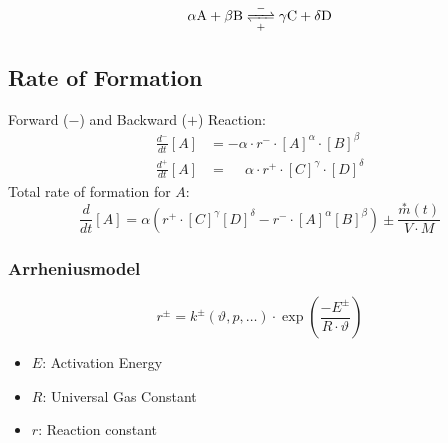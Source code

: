 \vspace{-0.5em}
\begin{align*}
    \alpha \ce{A} + \beta \ce{B} \underset{+}{\overset{-}{\ce{<=>}}}\gamma \ce{C} + \delta \ce{D}
\end{align*}
\subsection{Rate of Formation}
Forward ($-$) and Backward ($+$) Reaction:
\begin{align*}
    \frac{d^-}{dt}[A] &= - \alpha \cdot r^- \cdot [A]^\alpha \cdot [B]^\beta\\
    \frac{d^+}{dt}[A] &= \phantom{-} \alpha \cdot r^+ \cdot [C]^\gamma \cdot [D]^\delta
\end{align*}
Total rate of formation for $A$:
$$  
    \frac{d}{dt}[A] = \alpha \left( r^+ \cdot [C]^\gamma [D]^\delta - r^- \cdot [A]^\alpha [B]^\beta \right) \pm \frac{\overset{*}{m}(t)}{V \cdot M}
$$
\subsubsection{Arrheniusmodel}
    $$
        r^\pm = k^\pm (\vartheta, p, \dots) \cdot \exp\left(\frac{-E^\pm}{R \cdot \vartheta}\right)
    $$
    \begin{itemize}[label=-]
        \item $E$: Activation Energy
        \item $R$: Universal Gas Constant
        \item $r$: Reaction constant
    \end{itemize}